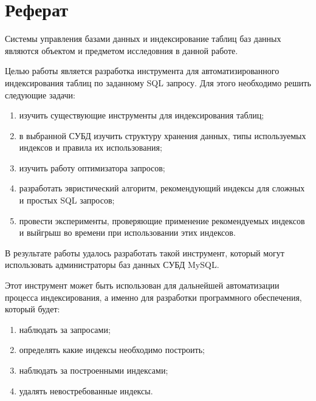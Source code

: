 \chapter{Реферат}

Системы управления базами данных и индексирование таблиц баз данных являются объектом и предметом исследовния в данной работе.  

Целью работы является разработка инструмента для автоматизированного индексирования таблиц по заданному SQL запросу. Для этого необходимо решить следующие задачи:

\begin{enumerate}
\item изучить существующие инструменты для индексирования таблиц;
\item в выбранной СУБД изучить структуру хранения данных, типы используемых индексов и правила их использования;
\item изучить работу оптимизатора запросов;
\item разработать эвристический алгоритм, рекомендующий индексы для сложных и простых SQL запросов;
\item провести эксперименты, проверяющие применение рекомендуемых индексов и выйгрыш во времени при использовании этих индексов.
\end{enumerate}

В результате работы удалось разработать такой инструмент, который могут использовать администраторы баз данных СУБД MySQL. 

Этот инструмент может быть использован для дальнейшей автоматизации процесса индексирования, а именно для разработки программного обеспечения, который будет:
\begin{enumerate}
\item наблюдать за запросами;
\item определять какие индексы необходимо построить;
\item наблюдать за построенными индексами;
\item удалять невостребованные индексы.
\end{enumerate}
